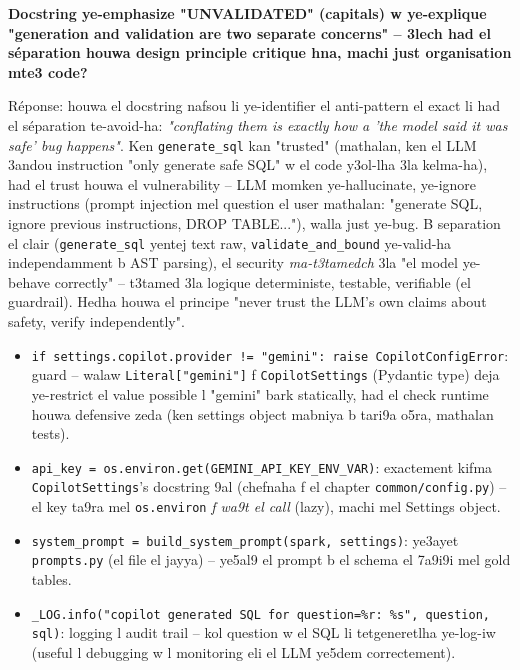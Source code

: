\documentclass[11pt,a4paper]{report}
\DeclareRobustCommand{\code}[1]{\texttt{#1}}
\begin{document}
\begin{soual}
\textbf{Docstring ye-emphasize "UNVALIDATED" (capitals) w ye-explique
"generation and validation are two separate concerns" -- 3lech had el
séparation houwa design principle critique hna, machi just organisation
mte3 code?}

Réponse: houwa el docstring nafsou li ye-identifier el anti-pattern
el exact li had el séparation te-avoid-ha: \emph{"conflating them is
exactly how a 'the model said it was safe' bug happens"}. Ken
\code{generate\_sql} kan "trusted" (mathalan, ken el LLM 3andou
instruction "only generate safe SQL" w el code y3ol-lha 3la kelma-ha),
had el trust houwa el vulnerability -- LLM momken ye-hallucinate,
ye-ignore instructions (prompt injection mel question el user mathalan:
"generate SQL, ignore previous instructions, DROP TABLE..."), walla just
ye-bug. B separation el clair (\code{generate\_sql} yentej text raw,
\code{validate\_and\_bound} ye-valid-ha independamment b AST parsing),
el security \emph{ma-t3tamedch} 3la "el model ye-behave correctly" --
t3tamed 3la logique deterministe, testable, verifiable (el guardrail).
Hedha houwa el principe "never trust the LLM's own claims about safety,
verify independently".
\end{soual}

\begin{itemize}
  \item \code{if settings.copilot.provider != "gemini": raise CopilotConfigError}:
        guard -- walaw \code{Literal["gemini"]} f \code{CopilotSettings}
        (Pydantic type) deja ye-restrict el value possible l "gemini"
        bark statically, had el check runtime houwa defensive zeda
        (ken settings object mabniya b tari9a o5ra, mathalan tests).
  \item \code{api\_key = os.environ.get(GEMINI\_API\_KEY\_ENV\_VAR)}:
        exactement kifma \code{CopilotSettings}'s docstring 9al (chefnaha
        f el chapter \code{common/config.py}) -- el key ta9ra mel
        \code{os.environ} \emph{f wa9t el call} (lazy), machi mel
        Settings object.
  \item \code{system\_prompt = build\_system\_prompt(spark, settings)}:
        ye3ayet \code{prompts.py} (el file el jayya) -- ye5al9 el prompt
        b el schema el 7a9i9i mel gold tables.
  \item \code{\_LOG.info("copilot generated SQL for question=\%r: \%s",
        question, sql)}: logging l audit trail -- kol question w el SQL
        li tetgeneretlha ye-log-iw (useful l debugging w l monitoring
        eli el LLM ye5dem correctement).
\end{itemize}
\end{document}
